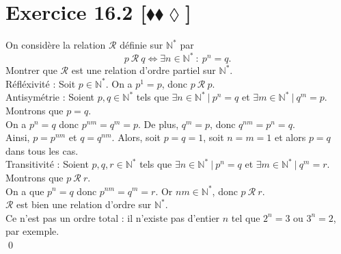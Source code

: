 \documentclass[10pt]{article}
\begin{document}
\section*{Exercice 16.2 [$\blacklozenge\blacklozenge\lozenge$]}
\begin{tcolorbox}[enhanced, width=7.6in, center, size=fbox, fontupper=\large, drop shadow southwest]
    On considère la relation $\mathcal{R}$ définie sur $\mathbb{N}^*$ par
    \begin{equation*}
        p ~ \mathcal{R} ~ q \iff \exists n \in \mathbb{N}^* ~ : ~ p^n = q.
    \end{equation*}
    Montrer que $\mathcal{R}$ est une relation d'ordre partiel sur $\mathbb{N}^*$.\\[0.15cm]
    Réfléxivité : Soit $p \in \mathbb{N}^*$. On a $p^1=p$, donc $p ~ \mathcal{R} ~ p$.\\[0.1cm]
    Antisymétrie : Soient $p,q\in\mathbb{N}^*$ tels que $\exists n \in \mathbb{N}^* ~ | ~ p^n = q$ et $\exists m \in \mathbb{N}^* ~ | ~ q^m = p$. Montrons que $p=q$.\\
    On a $p^n = q$ donc $p^{nm} = q^m = p$. De plus, $q^m = p$, donc $q^{nm} = p^n = q$.\\
    Ainsi, $p = p^{nm}$ et $q=q^{nm}$. Alors, soit $p = q = 1$, soit $n=m=1$ et alors $p=q$ dans tous les cas.\\[0.1cm]
    Transitivité : Soient $p,q,r \in \mathbb{N}^*$ tels que $\exists n \in \mathbb{N}^* ~ | ~ p^n = q$ et $\exists m \in \mathbb{N}^* ~ | ~ q^m = r$. Montrons que $p ~ \mathcal{R} ~ r$.\\
    On a que $p^{n} = q$ donc $p^{nm}=q^m=r$. Or $nm \in \mathbb{N}^*$, donc $p ~ \mathcal{R} ~ r$.\\[0.2cm]
    $\mathcal{R}$ est bien une relation d'ordre sur $\mathbb{N}^*$.\\
    Ce n'est pas un ordre total : il n'existe pas d'entier $n$ tel que $2^n=3$ ou $3^n=2$, par exemple.\\
    \qed
\end{tcolorbox}
\end{document}
